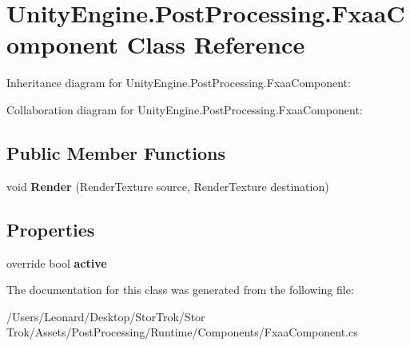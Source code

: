 \hypertarget{class_unity_engine_1_1_post_processing_1_1_fxaa_component}{}\section{Unity\+Engine.\+Post\+Processing.\+Fxaa\+Component Class Reference}
\label{class_unity_engine_1_1_post_processing_1_1_fxaa_component}


Inheritance diagram for Unity\+Engine.\+Post\+Processing.\+Fxaa\+Component\+:


Collaboration diagram for Unity\+Engine.\+Post\+Processing.\+Fxaa\+Component\+:
\subsection*{Public Member Functions}
\begin{DoxyCompactItemize}
\item 
\mbox{\label{class_unity_engine_1_1_post_processing_1_1_fxaa_component_a6525bbafd720828046143061fa322d9a}} 
void {\bfseries Render} (Render\+Texture source, Render\+Texture destination)
\end{DoxyCompactItemize}
\subsection*{Properties}
\begin{DoxyCompactItemize}
\item 
\mbox{\label{class_unity_engine_1_1_post_processing_1_1_fxaa_component_a957e4d3dd96f10cfb3668b391a188d43}} 
override bool {\bfseries active}
\end{DoxyCompactItemize}


The documentation for this class was generated from the following file\+:\begin{DoxyCompactItemize}
\item 
/\+Users/\+Leonard/\+Desktop/\+Stor\+Trok/\+Stor Trok/\+Assets/\+Post\+Processing/\+Runtime/\+Components/Fxaa\+Component.\+cs\end{DoxyCompactItemize}
